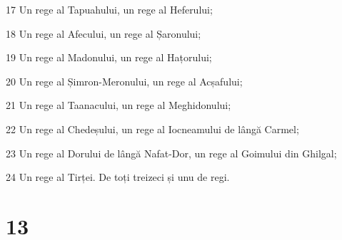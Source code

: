 \par 17 Un rege al Tapuahului, un rege al Heferului;
\par 18 Un rege al Afecului, un rege al Șaronului;
\par 19 Un rege al Madonului, un rege al Hațorului;
\par 20 Un rege al Șimron-Meronului, un rege al Acșafului;
\par 21 Un rege al Taanacului, un rege al Meghidonului;
\par 22 Un rege al Chedeșului, un rege al Iocneamului de lângă Carmel;
\par 23 Un rege al Dorului de lângă Nafat-Dor, un rege al Goimului din Ghilgal;
\par 24 Un rege al Tirței. De toți treizeci și unu de regi.

\chapter{13}

